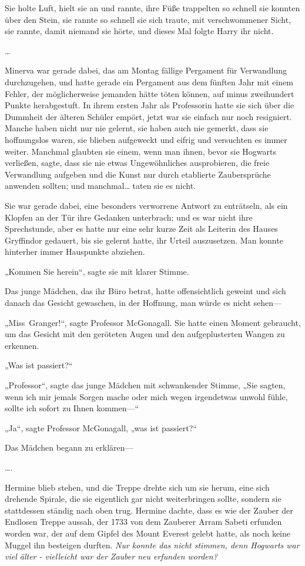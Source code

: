 {Sie holte Luft, hielt sie an und rannte, ihre Füße trappelten so schnell sie konnten über den Stein, sie rannte so schnell sie sich traute, mit verschwommener Sicht, sie rannte, damit niemand sie hörte, und dieses Mal folgte Harry ihr nicht.

…

Minerva war gerade dabei, das am Montag fällige Pergament für Verwandlung durchzugehen, und hatte gerade ein Pergament aus dem fünften Jahr mit einem Fehler, der möglicherweise jemanden hätte töten können, auf minus zweihundert Punkte herabgestuft. In ihrem ersten Jahr als Professorin hatte sie sich über die Dummheit der älteren Schüler empört, jetzt war sie einfach nur noch resigniert. Manche haben nicht nur nie gelernt, sie haben auch nie gemerkt, dass sie hoffnungslos waren, sie blieben aufgeweckt und eifrig und versuchten es immer weiter. Manchmal glaubten sie einem, wenn man ihnen, bevor sie Hogwarts verließen, sagte, dass sie nie etwas Ungewöhnliches ausprobieren, die freie Verwandlung aufgeben und die Kunst nur durch etablierte Zaubersprüche anwenden sollten; und manchmal… taten sie es nicht.

Sie war gerade dabei, eine besonders verworrene Antwort zu enträtseln, als ein Klopfen an der Tür ihre Gedanken unterbrach; und es war nicht ihre Sprechstunde, aber es hatte nur eine sehr kurze Zeit als Leiterin des Hauses Gryffindor gedauert, bis sie gelernt hatte, ihr Urteil auszusetzen. Man konnte hinterher immer Hauspunkte abziehen.

„Kommen Sie herein“, sagte sie mit klarer Stimme.

Das junge Mädchen, das ihr Büro betrat, hatte offensichtlich geweint und sich danach das Gesicht gewaschen, in der Hoffnung, man würde es nicht sehen—

„Miss~Granger!“, sagte Professor McGonagall. Sie hatte einen Moment gebraucht, um das Gesicht mit den geröteten Augen und den aufgeplusterten Wangen zu erkennen.

„Was ist passiert?“

„Professor“, sagte das junge Mädchen mit schwankender Stimme, „Sie sagten, wenn ich mir jemals Sorgen mache oder mich wegen irgendetwas unwohl fühle, sollte ich sofort zu Ihnen kommen—“

„Ja“, sagte Professor McGonagall, „was ist passiert?“

Das Mädchen begann zu erklären—

….

Hermine blieb stehen, und die Treppe drehte sich um sie herum, eine sich drehende Spirale, die sie eigentlich gar nicht weiterbringen sollte, sondern sie stattdessen ständig nach oben trug. Hermine dachte, dass es wie der Zauber der Endlosen Treppe aussah, der 1733 von dem Zauberer Arram Sabeti erfunden worden war, der auf dem Gipfel des Mount Everest gelebt hatte, als noch keine Muggel ihn besteigen durften. \emph{Nur konnte das nicht stimmen, denn Hogwarts war viel älter - vielleicht war der Zauber neu erfunden worden?}

}
